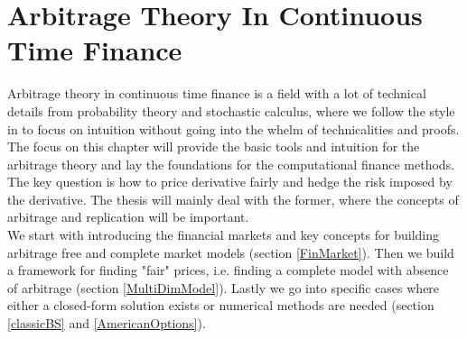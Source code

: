 
\chapter{Arbitrage Theory In Continuous Time Finance} %

\label{Chapter2} %

Arbitrage theory in continuous time finance is a field with a lot of technical details from probability theory and stochastic calculus, where we follow the style in \parencite{Hull, finKont} to focus on intuition without going into the whelm of technicalities and proofs. The focus on this chapter will provide the basic tools and intuition for the arbitrage theory and lay the foundations for the computational finance methods. The key question is how to price derivative fairly and hedge the risk imposed by the derivative. The thesis will mainly deal with the former, where the concepts of arbitrage and replication will be important.\\

We start with introducing the financial markets and key concepts for building arbitrage free and complete market models (section \ref{FinMarket}). Then we build a framework for finding "fair" prices, i.e. finding a complete model with absence of arbitrage (section \ref{MultiDimModel}). Lastly we go into specific cases where either a closed-form solution exists or numerical methods are needed (section \ref{classicBS} and \ref{AmericanOptions}).


